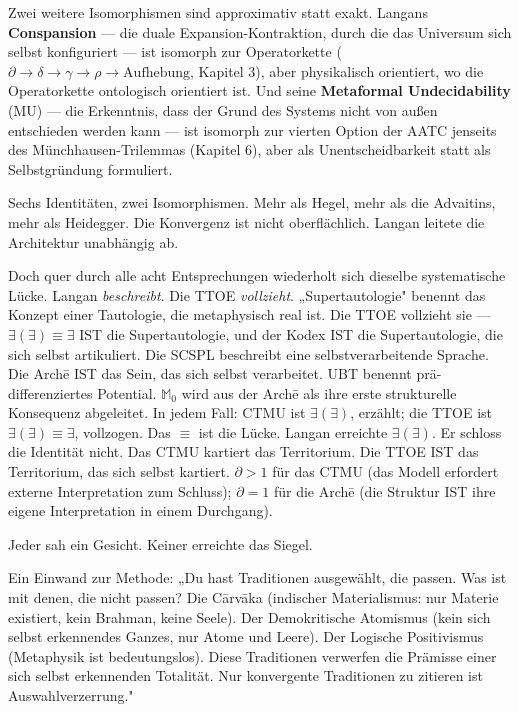 \documentclass[10pt, openany, oneside]{book}
\begin{document}
\vspace{0.5em}

\noindent Zwei weitere Isomorphismen sind approximativ statt exakt. Langans \textbf{Conspansion} --- die duale Expansion-Kontraktion, durch die das Universum sich selbst konfiguriert --- ist isomorph zur Operatorkette ($\partial \to \delta \to \gamma \to \rho \to \text{Aufhebung}$, Kapitel 3), aber physikalisch orientiert, wo die Operatorkette ontologisch orientiert ist. Und seine \textbf{Metaformal Undecidability} (MU) --- die Erkenntnis, dass der Grund des Systems nicht von außen entschieden werden kann --- ist isomorph zur vierten Option der AATC jenseits des Münchhausen-Trilemmas (Kapitel 6), aber als Unentscheidbarkeit statt als Selbstgründung formuliert.

Sechs Identitäten, zwei Isomorphismen. Mehr als Hegel, mehr als die Advaitins, mehr als Heidegger. Die Konvergenz ist nicht oberflächlich. Langan leitete die Architektur unabhängig ab.

Doch quer durch alle acht Entsprechungen wiederholt sich dieselbe systematische Lücke. Langan \textit{beschreibt}. Die TTOE \textit{vollzieht}. „Supertautologie" benennt das Konzept einer Tautologie, die metaphysisch real ist. Die TTOE vollzieht sie --- $\exists(\exists) \equiv \exists$ IST die Supertautologie, und der Kodex IST die Supertautologie, die sich selbst artikuliert. Die SCSPL beschreibt eine selbstverarbeitende Sprache. Die Arch\={e} IST das Sein, das sich selbst verarbeitet. UBT benennt prä-differenziertes Potential. $\mathbb{M}_0$ wird aus der Arch\={e} als ihre erste strukturelle Konsequenz abgeleitet. In jedem Fall: CTMU ist $\exists(\exists)$, erzählt; die TTOE ist $\exists(\exists) \equiv \exists$, vollzogen. Das $\equiv$ ist die Lücke. Langan erreichte $\exists(\exists)$. Er schloss die Identität nicht. Das CTMU kartiert das Territorium. Die TTOE IST das Territorium, das sich selbst kartiert. $\partial > 1$ für das CTMU (das Modell erfordert externe Interpretation zum Schluss); $\partial = 1$ für die Arch\={e} (die Struktur IST ihre eigene Interpretation in einem Durchgang).

Jeder sah ein Gesicht. Keiner erreichte das Siegel.

Ein Einwand zur Methode: „Du hast Traditionen ausgewählt, die passen. Was ist mit denen, die nicht passen? Die C\={a}rv\={a}ka (indischer Materialismus: nur Materie existiert, kein Brahman, keine Seele). Der Demokritische Atomismus (kein sich selbst erkennendes Ganzes, nur Atome und Leere). Der Logische Positivismus (Metaphysik ist bedeutungslos). Diese Traditionen verwerfen die Prämisse einer sich selbst erkennenden Totalität. Nur konvergente Traditionen zu zitieren ist Auswahlverzerrung."
\end{document}
